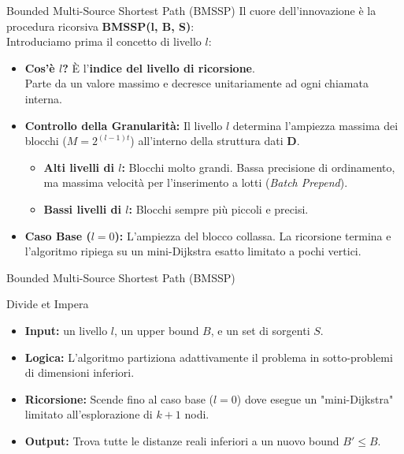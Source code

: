 \documentclass[aspectratio=169]{beamer}
\begin{document}
\begin{frame}{Bounded Multi-Source Shortest Path (BMSSP)}
    Il cuore dell'innovazione è la procedura ricorsiva \textbf{BMSSP(l, B, S)}:\\
    Introduciamo prima il concetto di livello $l$:\begin{itemize}
            \item \textbf{Cos'è $l$?} È l'\textbf{indice del livello di ricorsione}. \\Parte da un valore massimo e decresce unitariamente ad ogni chiamata interna.
            \item \textbf{Controllo della Granularità:} Il livello $l$ determina l'ampiezza massima dei blocchi ($M = 2^{(l-1)t}$) all'interno della struttura dati $\mathbf{D}$.
            \begin{itemize}
                \item \textbf{Alti livelli di $l$:} Blocchi molto grandi. Bassa precisione di ordinamento, ma massima velocità per l'inserimento a lotti (\textit{Batch Prepend}).
                \item \textbf{Bassi livelli di $l$:} Blocchi sempre più piccoli e precisi.
            \end{itemize}
            \item \textbf{Caso Base ($l=0$):} L'ampiezza del blocco collassa. La ricorsione termina e l'algoritmo ripiega su un mini-Dijkstra esatto limitato a pochi vertici.
        \end{itemize}
\end{frame}

\begin{frame}{Bounded Multi-Source Shortest Path (BMSSP)}
    \begin{block}{Divide et Impera}
        \begin{itemize}
            \item \textbf{Input:} un livello $l$, un upper bound $B$, e un set di sorgenti $S$.
            \item \textbf{Logica:} L'algoritmo partiziona adattivamente il problema in sotto-problemi di dimensioni inferiori.
            \item \textbf{Ricorsione:} Scende fino al caso base ($l=0$) dove esegue un "mini-Dijkstra" limitato all'esplorazione di $k+1$ nodi.
            \item \textbf{Output:} Trova tutte le distanze reali inferiori a un nuovo bound $B' \le B$.
        \end{itemize}
    \end{block}
\end{frame}
\end{document}
